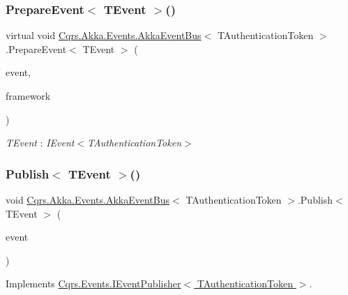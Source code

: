\subsubsection{\texorpdfstring{Prepare\+Event$<$ T\+Event $>$()}{PrepareEvent< TEvent >()}}
{\footnotesize\ttfamily virtual void \hyperlink{classCqrs_1_1Akka_1_1Events_1_1AkkaEventBus}{Cqrs.\+Akka.\+Events.\+Akka\+Event\+Bus}$<$ T\+Authentication\+Token $>$.Prepare\+Event$<$ T\+Event $>$ (\begin{DoxyParamCaption}\item[{T\+Event @}]{event,  }\item[{string}]{framework }\end{DoxyParamCaption})\hspace{0.3cm}{\ttfamily [virtual]}}

\begin{Desc}
\item[Type Constraints]\begin{description}
\item[{\em T\+Event} : {\em I\+Event$<$T\+Authentication\+Token$>$}]\end{description}
\end{Desc}
\mbox{\label{classCqrs_1_1Akka_1_1Events_1_1AkkaEventBus_aaba5d37020e21d03cc2bbc3da14f45ea_aaba5d37020e21d03cc2bbc3da14f45ea}} 
\subsubsection{\texorpdfstring{Publish$<$ T\+Event $>$()}{Publish< TEvent >()}\hspace{0.1cm}{\footnotesize\ttfamily [1/2]}}
{\footnotesize\ttfamily void \hyperlink{classCqrs_1_1Akka_1_1Events_1_1AkkaEventBus}{Cqrs.\+Akka.\+Events.\+Akka\+Event\+Bus}$<$ T\+Authentication\+Token $>$.Publish$<$ T\+Event $>$ (\begin{DoxyParamCaption}\item[{T\+Event @}]{event }\end{DoxyParamCaption})}



Implements \hyperlink{interfaceCqrs_1_1Events_1_1IEventPublisher_a02f0db0bc9b3aa1c7f766f58f8422ee3_a02f0db0bc9b3aa1c7f766f58f8422ee3}{Cqrs.\+Events.\+I\+Event\+Publisher$<$ T\+Authentication\+Token $>$}.

